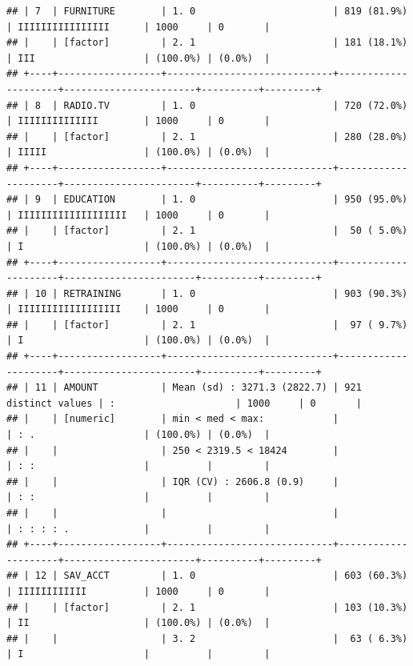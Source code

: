 \documentclass[
]{article}
\begin{document}
\begin{verbatim}
## | 7  | FURNITURE        | 1. 0                        | 819 (81.9%)         | IIIIIIIIIIIIIIII      | 1000     | 0       |
## |    | [factor]         | 2. 1                        | 181 (18.1%)         | III                   | (100.0%) | (0.0%)  |
## +----+------------------+-----------------------------+---------------------+-----------------------+----------+---------+
## | 8  | RADIO.TV         | 1. 0                        | 720 (72.0%)         | IIIIIIIIIIIIII        | 1000     | 0       |
## |    | [factor]         | 2. 1                        | 280 (28.0%)         | IIIII                 | (100.0%) | (0.0%)  |
## +----+------------------+-----------------------------+---------------------+-----------------------+----------+---------+
## | 9  | EDUCATION        | 1. 0                        | 950 (95.0%)         | IIIIIIIIIIIIIIIIIII   | 1000     | 0       |
## |    | [factor]         | 2. 1                        |  50 ( 5.0%)         | I                     | (100.0%) | (0.0%)  |
## +----+------------------+-----------------------------+---------------------+-----------------------+----------+---------+
## | 10 | RETRAINING       | 1. 0                        | 903 (90.3%)         | IIIIIIIIIIIIIIIIII    | 1000     | 0       |
## |    | [factor]         | 2. 1                        |  97 ( 9.7%)         | I                     | (100.0%) | (0.0%)  |
## +----+------------------+-----------------------------+---------------------+-----------------------+----------+---------+
## | 11 | AMOUNT           | Mean (sd) : 3271.3 (2822.7) | 921 distinct values | :                     | 1000     | 0       |
## |    | [numeric]        | min < med < max:            |                     | : .                   | (100.0%) | (0.0%)  |
## |    |                  | 250 < 2319.5 < 18424        |                     | : :                   |          |         |
## |    |                  | IQR (CV) : 2606.8 (0.9)     |                     | : :                   |          |         |
## |    |                  |                             |                     | : : : : .             |          |         |
## +----+------------------+-----------------------------+---------------------+-----------------------+----------+---------+
## | 12 | SAV_ACCT         | 1. 0                        | 603 (60.3%)         | IIIIIIIIIIII          | 1000     | 0       |
## |    | [factor]         | 2. 1                        | 103 (10.3%)         | II                    | (100.0%) | (0.0%)  |
## |    |                  | 3. 2                        |  63 ( 6.3%)         | I                     |          |         |

\end{verbatim}
\end{document}
